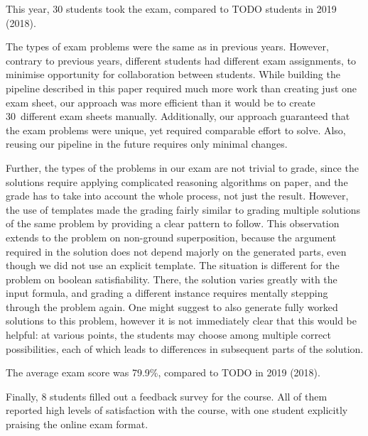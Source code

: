 This year, 30 students took the exam, compared to TODO students in 2019 (2018).

The types of exam problems were the same as in previous years.
However, contrary to previous years, different students had different exam
assignments, to minimise opportunity for collaboration between students.
%
While building the pipeline described in this paper required much more work
than creating just one exam sheet, our approach was more efficient than
it would be to create 30~different exam sheets manually. Additionally,
our approach guaranteed that the exam problems were
unique, yet required comparable effort to solve.
Also, reusing our pipeline in the future requires only minimal changes.

Further, the types of the problems in our exam are not trivial to grade, since
the solutions require applying complicated reasoning algorithms on paper, and
the grade has to take into account the whole process, not just the result.
However, the use of templates made the grading fairly similar to grading multiple
solutions of the same problem by providing a clear pattern to follow.
%
This observation extends to %
the problem on non-ground superposition,
because the argument required in the solution does not depend majorly on the generated parts,
even though we did not use an explicit template.
%
The situation is different for %
the problem on boolean satisfiability.
There, the solution varies greatly with the input formula,
and grading a different instance requires mentally stepping through the problem again.
One might suggest to also generate fully worked solutions to this problem,
however it is not immediately clear that this would be helpful:
at various points, the students may choose among multiple correct possibilities,
each of which leads to differences in subsequent parts of the solution.

The average exam score was 79.9\%, compared to TODO in 2019 (2018).

Finally, 8 students filled out a feedback survey for the course. All of them reported
high levels of satisfaction with the course, with one student explicitly praising the
online exam format.
